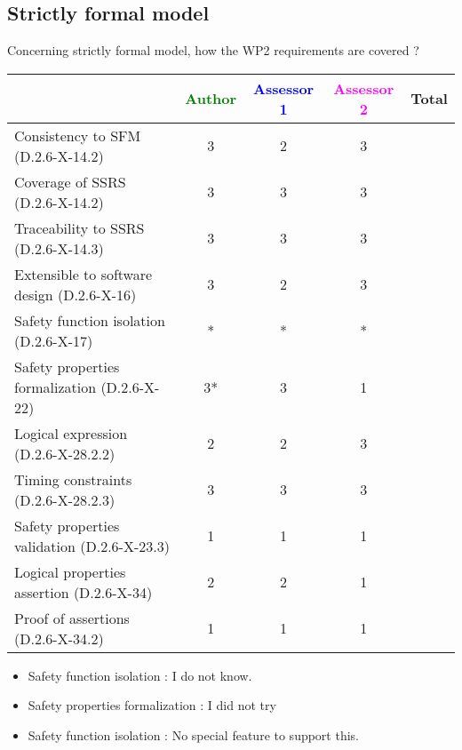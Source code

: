 \subsection{Strictly formal model}

Concerning strictly formal model, how the WP2 requirements are covered ?

\begin{tabular}{|l | c | c | c | c|}
\hline
& \textcolor{green}{Author} & \textcolor{blue}{Assessor 1} & \textcolor{magenta}{Assessor 2} & Total \\
\hline 
Consistency to SFM (D.2.6-X-14.2) &3 & 2& 3 &  \\
\hline
Coverage of SSRS (D.2.6-X-14.2)  & 3& 3& 3&  \\
\hline
Traceability to  SSRS (D.2.6-X-14.3)  & 3& 3& 3&  \\
\hline
Extensible to software design (D.2.6-X-16)  &3 & 2& 3&  \\
\hline
Safety function isolation (D.2.6-X-17)  & *  & * & * &  \\
\hline 
Safety properties formalization (D.2.6-X-22)  &3* & 3 & 1 &  \\
\hline
Logical expression (D.2.6-X-28.2.2)  &2 & 2& 3 &  \\
\hline
Timing constraints (D.2.6-X-28.2.3)  &3 & 3& 3&  \\
\hline
Safety properties validation (D.2.6-X-23.3)  &1 & 1& 1&  \\
\hline
Logical properties assertion (D.2.6-X-34)  &2 & 2& 1&  \\
\hline
Proof of assertions (D.2.6-X-34.2)  &1 & 1& 1&  \\
\hline
\end{tabular}

\begin{author_comment}
\begin{itemize}
\item Safety function isolation :  I do not know.
\item Safety properties formalization : I did not try
\end{itemize}

\end{author_comment}

\begin{assessor1}
\begin{itemize}
\item Safety function isolation :  No special feature to support this.
\end{itemize}

\end{assessor1}

